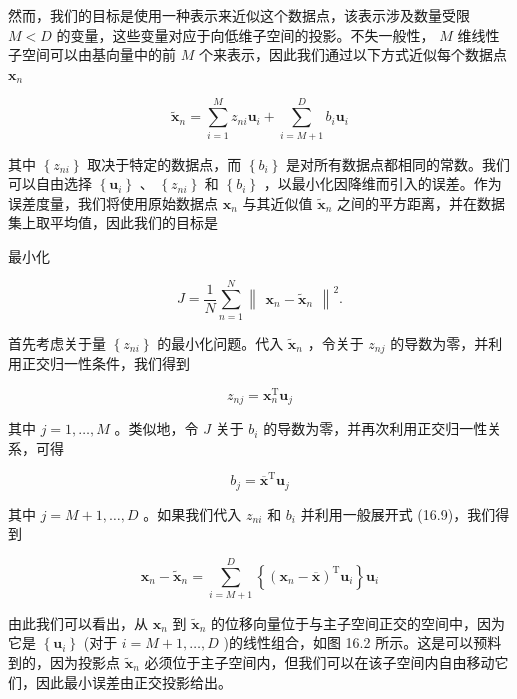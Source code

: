 \documentclass[10pt]{article}
\begin{document}
然而，我们的目标是使用一种表示来近似这个数据点，该表示涉及数量受限 \(M < D\) 的变量，这些变量对应于向低维子空间的投影。不失一般性， \(M\) 维线性子空间可以由基向量中的前 \(M\) 个来表示，因此我们通过以下方式近似每个数据点 \({\mathbf{x}}_{n}\)

\[
{\widetilde{\mathbf{x}}}_{n} = \mathop{\sum }\limits_{{i = 1}}^{M}{z}_{ni}{\mathbf{u}}_{i} + \mathop{\sum }\limits_{{i = M + 1}}^{D}{b}_{i}{\mathbf{u}}_{i} \tag{16.10}
\]

其中 \(\left\{  {z}_{ni}\right\}\) 取决于特定的数据点，而 \(\left\{  {b}_{i}\right\}\) 是对所有数据点都相同的常数。我们可以自由选择 \(\left\{  {\mathbf{u}}_{i}\right\}\) 、 \(\left\{  {z}_{ni}\right\}\) 和 \(\left\{  {b}_{i}\right\}\) ，以最小化因降维而引入的误差。作为误差度量，我们将使用原始数据点 \({\mathbf{x}}_{n}\) 与其近似值 \({\widetilde{\mathbf{x}}}_{n}\) 之间的平方距离，并在数据集上取平均值，因此我们的目标是

最小化

\[
J = \frac{1}{N}\mathop{\sum }\limits_{{n = 1}}^{N}{\begin{Vmatrix}{\mathbf{x}}_{n} - {\widetilde{\mathbf{x}}}_{n}\end{Vmatrix}}^{2}. \tag{16.11}
\]

首先考虑关于量 \(\left\{  {z}_{ni}\right\}\) 的最小化问题。代入 \({\widetilde{\mathbf{x}}}_{n}\) ，令关于 \({z}_{nj}\) 的导数为零，并利用正交归一性条件，我们得到

\[
{z}_{nj} = {\mathbf{x}}_{n}^{\mathrm{T}}{\mathbf{u}}_{j} \tag{16.12}
\]

其中 \(j = 1,\ldots ,M\) 。类似地，令 \(J\) 关于 \({b}_{i}\) 的导数为零，并再次利用正交归一性关系，可得

\[
{b}_{j} = {\overline{\mathbf{x}}}^{\mathrm{T}}{\mathbf{u}}_{j} \tag{16.13}
\]

其中 \(j = M + 1,\ldots ,D\) 。如果我们代入 \({z}_{ni}\) 和 \({b}_{i}\) 并利用一般展开式 (16.9)，我们得到

\[
{\mathbf{x}}_{n} - {\widetilde{\mathbf{x}}}_{n} = \mathop{\sum }\limits_{{i = M + 1}}^{D}\left\{  {{\left( {\mathbf{x}}_{n} - \overline{\mathbf{x}}\right) }^{\mathrm{T}}{\mathbf{u}}_{i}}\right\}  {\mathbf{u}}_{i} \tag{16.14}
\]

由此我们可以看出，从 \({\mathbf{x}}_{n}\) 到 \({\widetilde{\mathbf{x}}}_{n}\) 的位移向量位于与主子空间正交的空间中，因为它是 \(\left\{  {\mathbf{u}}_{i}\right\}\) (对于 \(i = M + 1,\ldots ,D\) )的线性组合，如图 16.2 所示。这是可以预料到的，因为投影点 \({\widetilde{\mathbf{x}}}_{n}\) 必须位于主子空间内，但我们可以在该子空间内自由移动它们，因此最小误差由正交投影给出。
\end{document}
